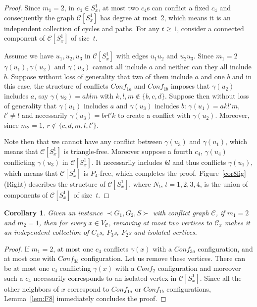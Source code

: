 \documentclass[final]{dmtcs-episciences}
\newtheorem{corollary}[theorem]{Corollary}
\newcommand\mar[1]{\textcolor{black}{#1}}
\begin{document}
\begin{proof}
Since $m_1=2$, in $c_4\in S_x^1$, at most two $c_4$s   can conflict a fixed $c_4$ and consequently the graph $\mathcal{C}[S_x^1]$ has degree at most~2, which means it is an independent  collection of cycles and paths. For any $t\geq 1$, consider a connected component of $\mathcal{C}[S_x^1]$ of size~$t$. 

Assume we have $u_1,u_2,u_3$ in $\mathcal{C}[S_x^1]$ with edges $u_1u_2$ and $u_2u_3$. Since $m_1=2$ $\gamma(u_1),\gamma(u_2)$ and $\gamma(u_3)$  cannot all include $a$ and neither can they all include $b$.  Suppose without loss of generality that two of them include $a$ and one $b$ and in this case, the structure of conflicts $Conf_{1a}$ and $Conf_{1b}$ imposes that $\gamma(u_2)$ includes $a$, say $\gamma(u_2)=aklm$ with $k,l,m\notin \{b,c,d\}$. Suppose then without loss of generality that $\gamma(u_1)$ includes $a$ and $\gamma(u_3)$ includes $b$: $\gamma(u_1)=akl'm$, $l'\neq l$ and necessarily $\gamma(u_3)=brl'k$ to create a conflict with $\gamma(u_2)$. Moreover, since $m_2=1$, $r\notin \{c,d,m,l,l'\}$.

Note then that we cannot have any conflict between $\gamma(u_3)$ and $\gamma(u_1)$, which means that $\mathcal{C}[S_x^1]$ is triangle-free. Moreover suppose a fourth $c_4$, $\gamma(u_4)$ conflicting $\gamma(u_3)$ in $\mathcal{C}[S_x^1]$. It necessarily includes $kl$ and thus conflicts $\gamma(u_1)$, which means that $\mathcal{C}[S_x^1]$ is $P_4$-free, which completes the proof. Figure~\ref{cor8fig} (Right) describes the structure of $\mathcal{C}[S_x^1]$, where $N_t$, $t=1,2,3,4$, is the union of components of $\mathcal{C}[S_x^1]$ of size~$t$.
\end{proof}





\begin{corollary}\label{polalg1}
Given an instance $\prec G_1,G_2,S \succ$ with conflict graph $\mathcal{C}$, if $m_1=2$ and $m_2=1$, then for every $x\in V_{\mathcal{C}}$, removing at most two vertices to $\mathcal{C}_x$ makes it an independent collection of $C_4$s, $P_3$s, $P_2$s and isolated vertices. 
\end{corollary}
\begin{proof} 
If $m_1=2$, at most one $c_4$ conflicts $\gamma(x)$  with a  $Conf_{3a}$  configuration, and 
at most one with  $Conf_{3b}$ configuration. Let us remove these vertices.  There can be at most one $c_4$ conflicting $\gamma(x)$ with a  $Conf_{2}$ configuration and moreover such a $c_4$ necessarily \mar{corresponds to} an isolated vertex in $\mathcal{C}[S_x^1]$. Since all the other neighbors of $x$ correspond to   $Conf_{1a}$ or $Conf_{1b}$ configurations,  Lemma~\ref{lem:F8} immediately concludes the proof.   
\end{proof}
\end{document}
